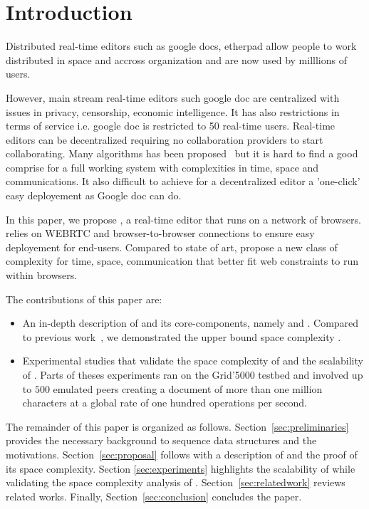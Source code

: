 
\section{Introduction}

Distributed real-time editors such as google docs, etherpad allow
people to work distributed in space and accross organization and are
now used by milllions of users. 

However, main stream real-time editors such google doc are centralized
with issues in privacy, censorship, economic intelligence. It has also
restrictions in terms of service i.e. google doc is restricted to 50
real-time users. Real-time editors can be decentralized requiring no
collaboration providers to start collaborating. Many algorithms has
been proposed~\cite{sun1998operational, sun2009contextbased,woot} but
it is hard to find a good comprise for a full working system with
complexities in time, space and communications. It also difficult to
achieve for a decentralized editor a 'one-click' easy deployement as
Google doc can do.

In this paper, we propose \CRATE, a real-time editor that runs on a
network of browsers. \CRATE relies on WEBRTC and browser-to-browser
connections to ensure easy deployement for end-users. Compared to
state of art, \CRATE propose a new class of complexity for time,
space, communication that better fit web constraints to run within
browsers.

The contributions of this paper are:
\begin{itemize}
\item An in-depth description of \CRATE and its core-components, namely \LSEQ
  and \SPRAY. Compared to previous work~\cite{doceng}, we demonstrated
  the upper bound space complexity \CRATE.  
\item Experimental studies that validate the space complexity of \LSEQ and the
  scalability of \CRATE. Parts of theses experiments ran on the Grid'5000
  testbed and involved up to $500$ emulated peers creating a document of more
  than one million characters at a global rate of one hundred operations per
  second.
\end{itemize}

The remainder of this paper is organized as
follows. Section~\ref{sec:preliminaries} provides the necessary background to
sequence data structures and the motivations. Section~\ref{sec:proposal}
follows with a description of \LSEQ and the proof of its space
complexity. Section \ref {sec:experiments} highlights the scalability of
\CRATE while validating the space complexity analysis of
\LSEQ. Section~\ref{sec:relatedwork} reviews related works. Finally,
Section~\ref{sec:conclusion} concludes the paper.




